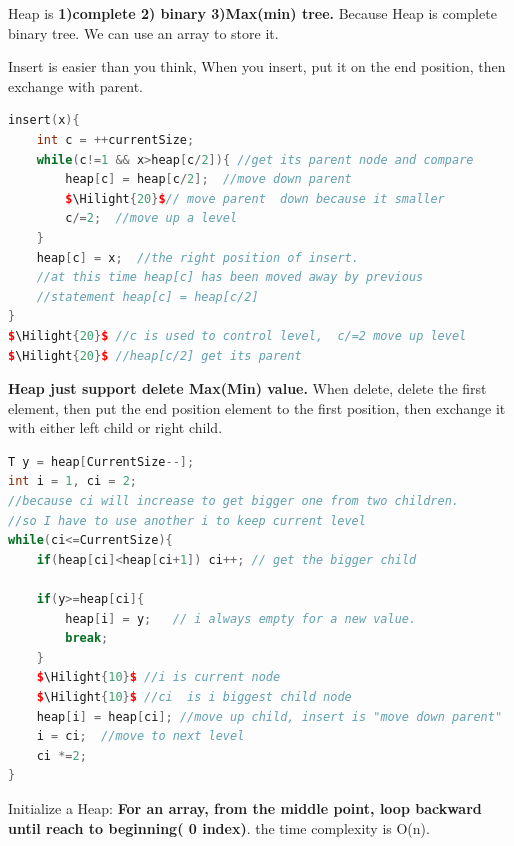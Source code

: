\documentclass[a4paper,11pt,twoside]{book}
\newcommand{\Hilight}[1]{\makebox[0pt][l]{\color{yellow}\rule[-3pt]{#1em}{11pt}}}
\begin{document}
\par Heap is \textbf{1)complete 2) binary 3)Max(min) tree.} Because Heap is complete binary tree. We can use an array to store it. 

\par Insert is easier than you think, When you insert, put it on the end position, then exchange with parent.  
\begin{lstlisting}[frame=single, language=c++, mathescape=true]
insert(x){
	int c = ++currentSize;
	while(c!=1 && x>heap[c/2]){ //get its parent node and compare
		heap[c] = heap[c/2];  //move down parent
		$\Hilight{20}$// move parent  down because it smaller
		c/=2;  //move up a level 
	}  
	heap[c] = x;  //the right position of insert. 
	//at this time heap[c] has been moved away by previous 
	//statement heap[c] = heap[c/2] 
}
$\Hilight{20}$ //c is used to control level,  c/=2 move up level
$\Hilight{20}$ //heap[c/2] get its parent	
\end{lstlisting}

\par \textbf{Heap just support delete Max(Min) value.} When delete, delete the first element, then put the end position element to the first position, then exchange it with either left child or right child. 
\begin{lstlisting}[frame=single, language=c++, mathescape=true]
T y = heap[CurrentSize--];
int i = 1, ci = 2;
//because ci will increase to get bigger one from two children.
//so I have to use another i to keep current level
while(ci<=CurrentSize){
	if(heap[ci]<heap[ci+1]) ci++; // get the bigger child
	
	if(y>=heap[ci]{
		heap[i] = y;   // i always empty for a new value. 
		break; 
	}
	$\Hilight{10}$ //i is current node
	$\Hilight{10}$ //ci  is i biggest child node
	heap[i] = heap[ci]; //move up child, insert is "move down parent"
	i = ci;  //move to next level
	ci *=2;
}	
\end{lstlisting}



\par Initialize a Heap: \textbf{For an array, from the middle point, loop backward until reach to beginning( 0 index)}. the time complexity is O(n). 
\end{document}
